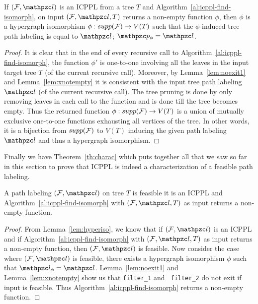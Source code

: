 \begin{lemma}
  \label{lem:hyperiso} %
  If $(\cF, \cl)$ is an ICPPL from a tree $T$ and
  Algorithm~\ref{al:icppl-find-isomorph}, on input $(\cF, \cl, T)$
  returns a non-empty function $\phi$, then $\phi$ is a hypergraph
  isomorphism $\phi : supp({\cal F}) \rightarrow V(T)$ such that the
  $\phi$-induced tree path labeling is equal to $\cl$; $\cp_\phi =
  \cl$.
\end{lemma}
\begin{proof}\thesisspacing
  It is clear that in the end of every recursive call to
  Algorithm~\ref{al:icppl-find-isomorph}, the function $\phi'$ is
  one-to-one involving all the leaves in the input target tree $T$ (of
  the current recursive call). Moreover, by Lemma~\ref{lem:noexit1}
  and Lemma~\ref{lem:xnotempty} it is consistent with the input tree
  path labeling $\cl$ (of the current recursive call). The tree
  pruning is done by only removing leaves in each call to the function
  and is done till the tree becomes empty. Thus the returned function
  $\phi: supp({\cal F}) \rightarrow V(T)$ is a union of mutually exclusive
  one-to-one functions exhausting all vertices of the tree. In other
  words, it is a bijection from $supp({\cal F})$ to $V(T)$ inducing the
  given path labeling $\cl$ and thus a hypergraph isomorphism. %
\end{proof}

Finally we have Theorem~\ref{th:charac} which puts together all that
we saw so far in this section to prove that ICPPL is indeed a
characterization of a feasible path labeling.
\begin{theorem}
  \label{th:charac}
  A path labeling $(\cF, \cl)$ on tree $T$ is feasible \iff it is an
  ICPPL and Algorithm~\ref{al:icppl-find-isomorph} with $(\cF, \cl,
  T)$ as input returns a non-empty function.
\end{theorem}
\begin{proof}\thesisspacing
  From Lemma~\ref{lem:hyperiso}, we know that if $(\cF, \cl)$ is an
  ICPPL and if Algorithm~\ref{al:icppl-find-isomorph} with $(\cF, \cl,
  T)$ as input returns a non-empty function, then $(\cF, \cl)$ is
  feasible.  Now consider the case where $(\cF, \cl)$ is
  feasible, \ie there exists a hypergraph isomorphism $\phi$ such
  that $\cl_\phi = \cl$. Lemma~\ref{lem:noexit1} and
  Lemma~\ref{lem:xnotempty} show us that {\tt filter\_1} and {\tt
    filter\_2} do not exit if input is feasible. Thus
  Algorithm~\ref{al:icppl-find-isomorph} returns a non-empty
  function.%
\end{proof}

